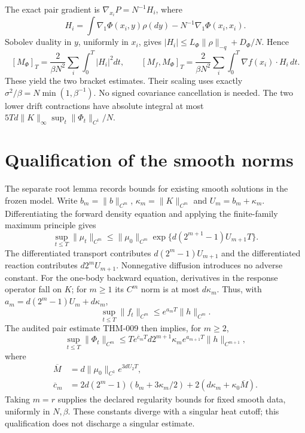 \documentclass[11pt]{article}
\begin{document}
The exact pair gradient is $\nabla_{x_i}P=N^{-1}H_i$, where
\[
 H_i=\int\nabla_1\Phi(x_i,y)\rho(dy)-N^{-1}\nabla_1\Phi(x_i,x_i).
\]
Sobolev duality in $y$, uniformly in $x_i$, gives
$|H_i|\le L_\Phi\|\rho\|_{-q}+D_\Phi/N$. Hence
\[
 [M_\Phi]_T=\frac2{\beta N^2}\sum_i\int_0^T|H_i|^2dt,
 \qquad
 [M_f,M_\Phi]_T=\frac2{\beta N^2}\sum_i\int_0^T\nabla f(x_i)\cdot H_i\,dt.
\]
These yield the two bracket estimates. Their scaling uses exactly
$\sigma^2/\beta=N\min(1,\beta^{-1})$. No signed covariance cancellation is
needed. The two lower drift contractions have absolute integral at most
$5Td\|K\|_\infty\sup_t\|\Phi_t\|_{C^1}/N$.

\section{Qualification of the smooth norms}
The separate root lemma records bounds for existing smooth solutions in the
frozen model. Write $b_m=\|b\|_{C^m}$, $\kappa_m=\|K\|_{C^m}$ and
$U_m=b_m+\kappa_m$. Differentiating the forward density equation and applying
the finite-family maximum principle gives
\[
 \sup_{t\le T}\|\mu_t\|_{C^m}
 \le\|\mu_0\|_{C^m}
       \exp\{d(2^{m+1}-1)U_{m+1}T\}.
\]
The differentiated transport contributes $d(2^m-1)U_{m+1}$ and the differentiated
reaction contributes $d2^mU_{m+1}$. Nonnegative diffusion introduces no adverse
constant. For the one-body backward equation, derivatives in the response
operator fall on $K$; for $m\ge1$ its $C^m$ norm is at most $d\kappa_m$.
Thus, with $a_m=d(2^m-1)U_m+d\kappa_m$,
\[
 \sup_{t\le T}\|f_t\|_{C^m}\le e^{a_mT}\|h\|_{C^m}.
\]
The audited pair estimate THM-009 then implies, for $m\ge2$,
\[
 \sup_{t\le T}\|\Phi_t\|_{C^m}
 \le T e^{\overline c_mT}d2^{m+1}\kappa_m
                         e^{a_{m+1}T}\|h\|_{C^{m+1}},
\]
where
\begin{align*}
 \overline M&=d\|\mu_0\|_{C^1}e^{3dU_2T},\\
 \overline c_m&=2d(2^m-1)(b_m+3\kappa_m/2)
                      +2(d\kappa_m+\kappa_0\overline M).
\end{align*}
Taking $m=r$ supplies the declared regularity bounds for fixed smooth data,
uniformly in $N,\beta$. These constants diverge with a singular heat cutoff;
this qualification does not discharge a singular estimate.
\end{document}
